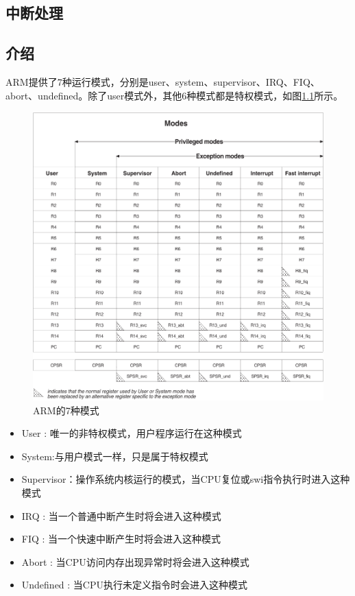 \documentclass[main.tex]{subfiles}
\begin{document}
\ifxetex\else\begin{CJK*}{UTF8}{song}\fi

\chapter{中断处理}
\section{介绍}
ARM提供了7种运行模式，分别是user、system、supervisor、IRQ、FIQ、abort、undefined。除了user模式外，其他6种模式都是特权模式，如图\ref{figure:3-1}所示。

\begin{figure}[htp]
\centering
\includegraphics[scale=0.5]{figures/3-1.png}
\caption{ARM的7种模式}
\label{figure:3-1}
\end{figure}

\begin{itemize}
\item User : 唯一的非特权模式，用户程序运行在这种模式
\item System:与用户模式一样，只是属于特权模式
\item Supervisor：操作系统内核运行的模式，当CPU复位或swi指令执行时进入这种模式
\item IRQ :   当一个普通中断产生时将会进入这种模式
\item FIQ :   当一个快速中断产生时将会进入这种模式
\item Abort : 当CPU访问内存出现异常时将会进入这种模式
\item Undefined : 当CPU执行未定义指令时会进入这种模式
\end{itemize}


\end{CJK*}
\end{document}
